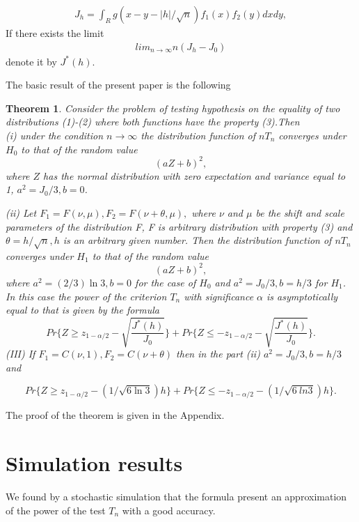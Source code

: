 \documentclass[final,11pt,3p]{elsarticle}
\newtheorem{theorem}{Theorem}
\begin{document}
\begin{eqnarray*}
J_h =\int_R g(x-y-|h|/\sqrt{n})f_1(x)f_2(y)dxdy,
\end{eqnarray*}
If there exists the limit
\begin{eqnarray}
lim_{n\to \infty} n(J_h - J_0)
\end{eqnarray}
denote it by $J^*(h)$.

The basic result of the present paper is the following
\begin{theorem} Consider the problem of testing hypothesis on the equality of two distributions (1)-(2) where both functions have the property (3).Then\\
(i) under the condition $n \to \infty$
the distribution function of $nT_n$  converges under $H_0$ to that of the random value
\begin{equation}\label{Distr}
(aZ + b)^2,
\end{equation}
where  $Z$ has the normal distribution with zero expectation and variance equal to 1, $a^2= J_0/3, b=0$.

(ii)
Let $F_1= F(\nu,\mu),F_2=F(\nu+\theta,\mu),$
where $\nu$  and $\mu$ be the shift and scale parameters of the distribution F, F is arbitrary distribution with property   (3) and 
$\theta=h/\sqrt{n},h$ is an arbitrary given number. Then
the distribution function of $nT_n$  converges under $H_1$ to that of the random value
$$
(aZ + b)^2,
$$
where $a^2 =(2/3)\ln 3, b=0$
for the case of $H_0$ and
$a^2= J_0/3, b= h/3$
for  $H_1$.
In this case the power of the criterion $T_n$ with significance $\alpha$ is asymptotically equal to that is given by the formula
$$
Pr\{Z\geq z_{1-\alpha/2}-\sqrt{\frac {J^*(h)}{J_0}}\}
+ Pr\{Z\leq - z_{1-\alpha/2}-\sqrt{\frac {J^*(h)}{J_0}}\}.
$$
(III) If $F_1=C(\nu,1), F_2=C(\nu + \theta)$ then in the part (ii)
$a^2= J_0/3, b= h/3$ and

$$
Pr\{Z\geq z_{1-\alpha/2}-(1/\sqrt{6\ln 3})h\}
+ Pr\{Z\leq - z_{1-\alpha/2}-(1/\sqrt{6\
ln 3})h\}.
$$
\end{theorem}


The proof of the theorem is given in the Appendix.


\section{Simulation results}


 We found by a stochastic simulation that the formula present an approximation of the power of the test $T_n$ with a good accuracy.
\end{document}
